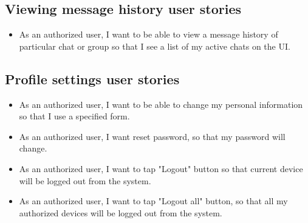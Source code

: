 \subsection{Viewing message history user stories}\label{subsec:viewing-message-history-feature-user-stories}
\begin{itemize}
    \item As an authorized user, I want to be able to view a message history of particular chat or group
    so that I see a list of my active chats on the UI\@.
\end{itemize}

\subsection{Profile settings user stories}\label{subsec:profile-settings-user-stories}
\begin{itemize}
    \item As an authorized user, I want to be able to change my personal information so that I use a specified form.
    \item As an authorized user, I want reset password, so that my password will change.
    \item As an authorized user, I want to tap "Logout" button so that current device will be logged out from the system.
    \item As an authorized user, I want to tap "Logout all" button, so that all my authorized devices will be
    logged out from the system.
\end{itemize}
